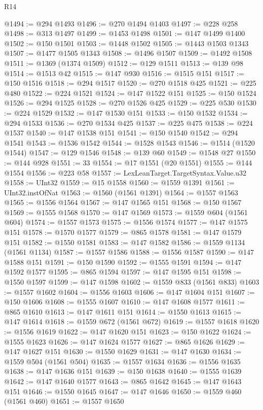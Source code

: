 \begin{lexlean}{R14}
\begin{coremodule}
@1494 := @294 @1493
@1496 := @270 @1494 @1403
@1497 := @228 @258
@1498 := @313 @1497
@1499 := @1453 @1498
@1501 := @147 @1499 @1400
@1502 := @150 @1501
@1503 := @1448 @1502
@1505 := @1443 @1503 @1343
@1507 := @1477 @1505 @1343
@1508 := @1496 @1507
@1509 := @1492 @1508
@1511 := @1369 (@1374 @1509)
@1512 := @129 @1511
@1513 := @139 @98
@1514 := @1513 @42
@1515 := @147 @930
@1516 := @1515 @151
@1517 := @150 @1516
@1518 := @294 @1517
@1520 := @270 @1518 @425
@1521 := @225 @480
@1522 := @224 @1521
@1524 := @147 @1522 @151
@1525 := @150 @1524
@1526 := @294 @1525
@1528 := @270 @1526 @425
@1529 := @225 @530
@1530 := @224 @1529
@1532 := @147 @1530 @151
@1533 := @150 @1532
@1534 := @294 @1533
@1536 := @270 @1534 @425
@1537 := @225 @475
@1538 := @224 @1537
@1540 := @147 @1538 @151
@1541 := @150 @1540
@1542 := @294 @1541
@1543 := @1536 @1542
@1544 := @1528 @1543
@1546 := @1514 (@1520 @1544)
@1547 := @129 @1546
@1548 := @139 @60
@1549 := @1548 @27
@1550 := @144 @928
@1551 := 33
@1554 := @17 @1551 (@20 @1551)
@1555 := @144 @1554
@1556 := @223 @58
@1557 := LexLeanTarget.TargetSyntax.Value.u32
@1558 := UInt32
@1559 := @15 @1558
@1560 := @1559 @1391
@1561 := UInt32.instOfNat
@1563 := @1560 (@1561 @1391)
@1564 := @1557 @1563
@1565 := @1556 @1564
@1567 := @147 @1565 @151
@1568 := @150 @1567
@1569 := @1555 @1568
@1570 := @147 @1569
@1573 := @1559 @604 (@1561 @604)
@1574 := @1557 @1573
@1575 := @1556 @1574
@1577 := @147 @1575 @151
@1578 := @1570 @1577
@1579 := @865 @1578
@1581 := @147 @1579 @151
@1582 := @1550 @1581
@1583 := @147 @1582
@1586 := @1559 @1134 (@1561 @1134)
@1587 := @1557 @1586
@1588 := @1556 @1587
@1590 := @147 @1588 @151
@1591 := @150 @1590
@1592 := @1555 @1591
@1594 := @147 @1592 @1577
@1595 := @865 @1594
@1597 := @147 @1595 @151
@1598 := @1550 @1597
@1599 := @147 @1598
@1602 := @1559 @833 (@1561 @833)
@1603 := @1557 @1602
@1604 := @1556 @1603
@1606 := @147 @1604 @151
@1607 := @150 @1606
@1608 := @1555 @1607
@1610 := @147 @1608 @1577
@1611 := @865 @1610
@1613 := @147 @1611 @151
@1614 := @1550 @1613
@1615 := @147 @1614
@1618 := @1559 @672 (@1561 @672)
@1619 := @1557 @1618
@1620 := @1556 @1619
@1622 := @147 @1620 @151
@1623 := @150 @1622
@1624 := @1555 @1623
@1626 := @147 @1624 @1577
@1627 := @865 @1626
@1629 := @147 @1627 @151
@1630 := @1550 @1629
@1631 := @147 @1630
@1634 := @1559 @504 (@1561 @504)
@1635 := @1557 @1634
@1636 := @1556 @1635
@1638 := @147 @1636 @151
@1639 := @150 @1638
@1640 := @1555 @1639
@1642 := @147 @1640 @1577
@1643 := @865 @1642
@1645 := @147 @1643 @151
@1646 := @1550 @1645
@1647 := @147 @1646
@1650 := @1559 @460 (@1561 @460)
@1651 := @1557 @1650

\end{coremodule}
\end{lexlean}

